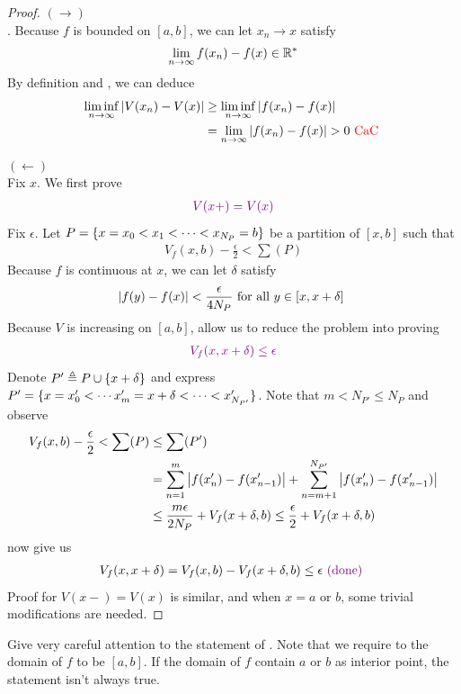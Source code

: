 \documentclass{report}
\begin{document}
\begin{proof}
$(\longrightarrow)$\\

. Because $f$ is bounded on  $[a,b]$, we can let $x_n \to x$ satisfy 
\begin{align*}
  \lim_{n\to \infty} f(x_n)-f(x)\in\mathbb{R}^*
\end{align*}
By definition and , we can deduce  
\begin{align*}
  \liminf_{n\to\infty} \abso{V(x_n)-V(x)}&\geq \liminf_{n\to\infty} \abso{f(x_n)-f(x)} \\
  &=\lim_{n\to \infty} \abso{f(x_n)-f(x)}>0 \tCaC
\end{align*}

$(\longleftarrow)$\\

Fix $x$. We first prove 
\begin{align*}
\textcolor{violet}{V(x+)=V(x)}
\end{align*}
Fix $\epsilon $. Let $P=\{ x=x_0<x_1 <\cdots < x_{N_P}=b \}$ be a partition of $[x,b]$ such that 
\begin{align*}
V_f(x,b) - \frac{\epsilon}{2} < \sum (P) 
\end{align*}
Because $f$ is continuous at $x$, we can let $\delta$ satisfy 
\begin{align*}
  \left|f(y)-f(x)\right|< \frac{\epsilon}{4N_P}\text{ for all $y \in [x,x+\delta]$ }
\end{align*}
Because $V$ is increasing on  $[a,b]$,  allow us to reduce the problem into proving 
\begin{align*}
  \textcolor{violet}{V_f(x,x+\delta)\leq \epsilon }
\end{align*}
Denote $P'\triangleq  P\cup \{ x+\delta \}$ and express  $P'=\{ x=x_0' < \cdots x'_m =x+\delta < \cdots < x_{N_{P'}}'  \}$. Note that $m<N_{P'}\leq N_P$ and observe
\begin{align*}
  V_f(x,b)- \frac{\epsilon}{2}< \sum (P)&\leq \sum (P')\\
&= \sum_{n=1}^{m} \left|f(x'_n)-f(x'_{n-1})\right| + \sum_{n=m+1}^{N_{P'}} \left|f(x'_n)-f(x'_{n-1})\right|\\
&\leq \frac{m\epsilon }{2N_P}  + V_f(x+\delta,b)\leq \frac{\epsilon }{2}+ V_f(x+\delta ,b)
\end{align*}
 now give us 
\begin{align*}
V_f(x,x+\delta)=V_f(x,b)-V_f(x+\delta,b)\leq \epsilon  \textcolor{violet}{\text{ (done) }}
\end{align*}
Proof for $V(x-)=V(x)$ is similar, and when $x=a\text{ or }b$, some trivial modifications are needed.
\end{proof}
\begin{mdframed}
Give very careful attention to the statement of . Note that we require to the domain of $f$ to be $[a,b]$. If the domain of $f$ contain  $a\text{ or }b$ as interior point, the statement isn't always true. 
\end{mdframed}
\end{document}
